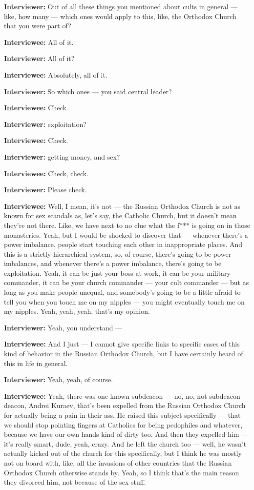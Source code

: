 \textbf{Interviewer:} Out of all these things you mentioned about cults in general — like, how many — which ones would apply to this, like, the Orthodox Church that you were part of?

\textbf{Interviewee:} All of it.

\textbf{Interviewer:} All of it?

\textbf{Interviewee:} Absolutely, all of it.

\textbf{Interviewer:} So which ones — you said central leader?

\textbf{Interviewee:} Check.

\textbf{Interviewer:} exploitation?

\textbf{Interviewee:} Check.

\textbf{Interviewer:} getting money, and sex?

\textbf{Interviewee:} Check, check.

\textbf{Interviewer:} Please check.

\textbf{Interviewee:} Well, I mean, it's not — the Russian Orthodox Church is not as known for sex scandals as, let's say, the Catholic Church, but it doesn't mean they're not there. Like, we have next to no clue what the f*** is going on in those monasteries. Yeah, but I would be shocked to discover that — whenever there's a power imbalance, people start touching each other in inappropriate places. And this is a strictly hierarchical system, so, of course, there's going to be power imbalances, and whenever there's a power imbalance, there's going to be exploitation. Yeah, it can be just your boss at work, it can be your military commander, it can be your church commander — your cult commander — but as long as you make people unequal, and somebody's going to be a little afraid to tell you when you touch me on my nipples — you might eventually touch me on my nipples. Yeah, yeah, yeah, that's my opinion.

\textbf{Interviewer:} Yeah, you understand —

\textbf{Interviewee:} And I just — I cannot give specific links to specific cases of this kind of behavior in the Russian Orthodox Church, but I have certainly heard of this in life in general.

\textbf{Interviewer:} Yeah, yeah, of course.

\textbf{Interviewee:} Yeah, there was one known subdeacon — no, no, not subdeacon — deacon, Andrei Kuraev, that's been expelled from the Russian Orthodox Church for actually being a pain in their ass. He raised this subject specifically — that we should stop pointing fingers at Catholics for being pedophiles and whatever, because we have our own hands kind of dirty too. And then they expelled him — it's really smart, dude, yeah, crazy. And he left the church too — well, he wasn't actually kicked out of the church for this specifically, but I think he was mostly not on board with, like, all the invasions of other countries that the Russian Orthodox Church otherwise stands by. Yeah, so I think that's the main reason they divorced him, not because of the sex stuff.

